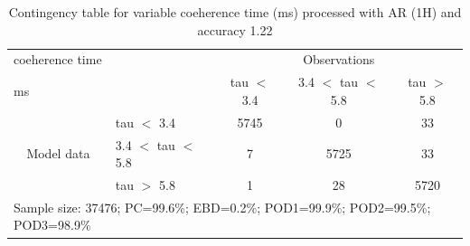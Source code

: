 \begin{table}[]
\begin{center}
\begin{tabular}{llccc}
\hline
{coeherence time}                                       &                                                    & \multicolumn{3}{c}{Observations}                 \\
{ms}                                       &                             & tau $<$ 3.4   & 3.4 $<$ tau $<$ 5.8 & tau $>$ 5.8 \\
\hline
\multicolumn{1}{c}{\multirow{3}{*}{Model data}}  & tau $<$ 3.4             & 5745                & 0                       & 33              \\
                                                 & 3.4  $<$ tau $<$ 5.8 & 7                & 5725                       & 33              \\
                                                 & tau $>$ 5.8             & 1                & 28                       & 5720              \\
\hline
\multicolumn{5}{l}{Sample size: 37476; PC=99.6\%; EBD=0.2\%; POD1=99.9\%; POD2=99.5\%; POD3=98.9\%}
\end{tabular}
\end{center}
\caption{Contingency table for variable coeherence time (ms) processed with AR (1H) and accuracy 1.22}
\label{tab:contingencytauAFT}
\end{table}
